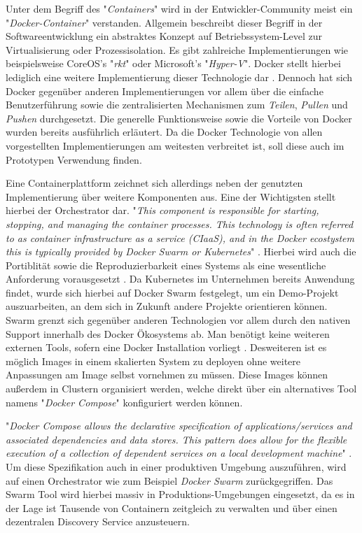 Unter dem Begriff des "\emph{Containers}" wird in der Entwickler-Community meist ein "\emph{Docker-Container}" verstanden. Allgemein beschreibt dieser Begriff in der Softwareentwicklung ein abstraktes Konzept auf Betriebssystem-Level zur Virtualisierung oder Prozessisolation. Es gibt zahlreiche Implementierungen wie beispielsweise CoreOS's "\emph{rkt}" oder Microsoft's "\emph{Hyper-V}". Docker stellt hierbei lediglich eine weitere Implementierung dieser Technologie dar \cite[Seite~63 ff.]{continuous-delivery}. Dennoch hat sich Docker gegenüber anderen Implementierungen vor allem über die einfache Benutzerführung sowie die zentralisierten Mechanismen zum \emph{Teilen}, \emph{Pullen} und \emph{Pushen} durchgesetzt. Die generelle Funktionsweise sowie die Vorteile von Docker wurden bereits ausführlich erläutert. Da die Docker Technologie von allen vorgestellten Implementierungen am weitesten verbreitet ist, soll diese auch im Prototypen Verwendung finden. 

Eine Containerplattform zeichnet sich allerdings neben der genutzten Implementierung über weitere Komponenten aus. Eine der Wichtigsten stellt hierbei der Orchestrator dar. "\emph{This component is responsible for starting, stopping, and managing the container processes. This technology is often referred to as container infrastructure as a service (CIaaS), and in the Docker ecostystem this is typically provided by Docker Swarm or Kubernetes}" \cite[Seite~64 ff.]{continuous-delivery}. Hierbei wird auch die Portiblität sowie die Reproduzierbarkeit eines Systems als eine wesentliche Anforderung vorausgesetzt \cite[Kapitel Orchestration]{docker-doc}. Da Kubernetes im Unternehmen bereits Anwendung findet, wurde sich hierbei auf Docker Swarm festgelegt, um ein Demo-Projekt auszuarbeiten, an dem sich in Zukunft andere Projekte orientieren können. Swarm grenzt sich gegenüber anderen Technologien vor allem durch den nativen Support innerhalb des Docker Ökosystems ab. Man benötigt keine weiteren externen Tools, sofern eine Docker Installation vorliegt \cite[Seite~10 ff.]{soppelsaswarm}. Desweiteren ist es möglich Images in einem skalierten System zu deployen ohne weitere Anpassungen am Image selbst vornehmen zu müssen. Diese Images können außerdem in Clustern organisiert werden, welche direkt über ein alternatives Tool namens "\emph{Docker Compose}" konfiguriert werden können.

"\emph{Docker Compose allows the declarative specification of applications/services and associated dependencies and data stores. This pattern does allow for the flexible execution of a collection of dependent services on a local development machine}" \cite[Seite~173]{continuous-delivery}. Um diese Spezifikation auch in einer produktiven Umgebung auszuführen, wird auf einen Orchestrator wie zum Beispiel \emph{Docker Swarm} zurückgegriffen. Das Swarm Tool wird hierbei massiv in Produktions-Umgebungen eingesetzt, da es in der Lage ist Tausende von Containern zeitgleich zu verwalten und über einen dezentralen Discovery Service anzusteuern. 

